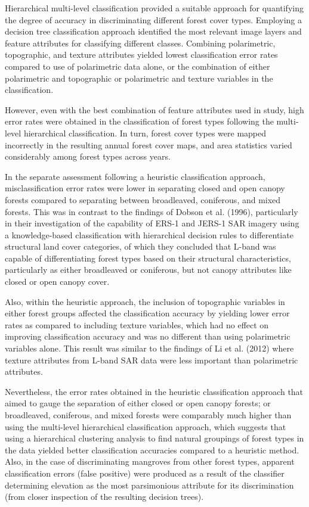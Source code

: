 Hierarchical multi-level classification provided a suitable approach for quantifying the degree of accuracy in discriminating different forest cover types. Employing a decision tree classification approach identified the most relevant image layers and feature attributes for classifying different classes. Combining polarimetric, topographic, and texture attributes yielded lowest classification error rates compared to use of polarimetric data alone, or the combination of either polarimetric and topographic or polarimetric and texture variables in the classification.

However, even with the best combination of feature attributes used in study, high error rates were obtained in the classification of forest types following the multi-level hierarchical classification. In turn, forest cover types were mapped incorrectly in the resulting annual forest cover maps, and area statistics varied considerably among forest types across years.

In the separate assessment following a heuristic classification approach, misclassification error rates were lower in separating closed and open canopy forests compared to separating between broadleaved, coniferous, and mixed forests. This was in contrast to the findings of Dobson et al. (1996), particularly in their investigation of the capability of ERS-1 and JERS-1 SAR imagery using a knowledge-based classification with hierarchical decision rules to differentiate structural land cover categories, of which they concluded that L-band was capable of differentiating forest types based on their structural characteristics, particularly as either broadleaved or coniferous, but not canopy attributes like closed or open canopy cover.

Also, within the heuristic approach, the inclusion of topographic variables in either forest groups affected the classification accuracy by yielding lower error rates as compared to including texture variables, which had no effect on improving classification accuracy and was no different than using polarimetric variables alone. This result was similar to the findings of Li et al. (2012) where texture attributes from L-band SAR data were less important than polarimetric attributes.

Nevertheless, the error rates obtained in the heuristic classification approach that aimed to gauge the separation of either closed or open canopy forests; or broadleaved, coniferous, and mixed forests were comparably much higher than using the multi-level hierarchical classification approach, which suggests that using a hierarchical clustering analysis to find natural groupings of forest types in the data yielded better classification accuracies compared to a heuristic method. Also, in the case of discriminating mangroves from other forest types, apparent classification errors (false positive) were produced as a result of the classifier determining elevation as the most parsimonious attribute for its discrimination (from closer inspection of the resulting decision trees).


